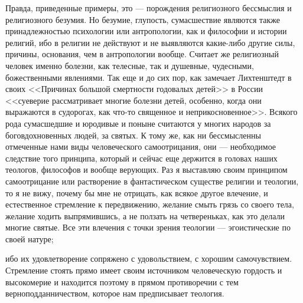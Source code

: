 \documentclass[12pt]{article}
\begin{document}
Правда, приведенные примеры, это --- порождения религиозного бессмыслия и религиозного безумия. Но безумие, глупость, сумасшествие являются также принадлежностью психологии или антропологии, как и философии и истории религий, ибо в религии не действуют и не выявляются какие-либо другие силы, причины, основания, чем в антропологии вообще. Считает же религиозный человек именно болезни, как телесные, так и душевные, чудесными, божественными явлениями. Так еще и до сих пор, как замечает Лихтенштедт в своих <<Причинах большой смертности годовалых детей>> в России <<суеверие рассматривает многие болезни детей, особенно, когда они выражаются в судорогах, как что-то священное и неприкосновенное>>. Всякого рода сумасшедшие и юродивые и поныне считаются у многих народов за боговдохновенных людей, за святых. К тому же, как ни бессмысленны отмеченные нами виды человеческого самоотрицания, они --- необходимое следствие того принципа, который и сейчас еще держится в головах наших теологов, философов и вообще верующих. Раз я выставляю своим принципом самоотрицание или растворение в фантастическом существе религии и теологии, то я не вижу, почему бы мне не отрицать, как всякое другое влечение, и естественное стремление к передвижению, желание смыть грязь со своего тела, желание ходить выпрямившись, а не ползать на четвереньках, как это делали многие святые. Все эти влечения с точки зрения теологии --- эгоистические по своей натуре; 

ибо их удовлетворение сопряжено с удовольствием, с хорошим самочувствием. Стремление стоять прямо имеет своим источником человеческую гордость и высокомерие и находится поэтому в прямом противоречии с тем верноподданничеством, которое нам предписывает теология. 
\end{document}
